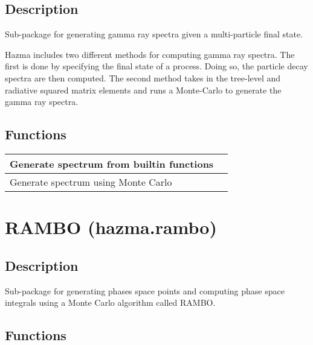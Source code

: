 \documentclass[letterpaper,10pt,english]{sphinxmanual}
\begin{document}
\section{Description}
\label{\detokenize{gamma_ray:description}}
Sub-package for generating gamma ray spectra given a multi-particle final state.

Hazma includes two different methods for computing gamma ray spectra. The first is done by specifying the final state of a process. Doing so, the particle decay spectra are then computed. The second method  takes in the tree-level and radiative squared matrix elements and runs a Monte-Carlo to generate the gamma ray spectra.


\section{Functions}
\label{\detokenize{gamma_ray:functions}}

\begin{savenotes}\sphinxattablestart
\centering
\begin{tabulary}{\linewidth}[t]{|T|T|}
\hline

Generate spectrum from builtin functions
&
\\
\hline
Generate spectrum using Monte Carlo
&
\\
\hline
\end{tabulary}
\par
\sphinxattableend\end{savenotes}


\chapter{RAMBO (hazma.rambo)}
\label{\detokenize{rambo::doc}}\label{\detokenize{rambo:rambo-hazma-rambo}}

\section{Description}
\label{\detokenize{rambo:description}}
Sub-package for generating phases space points and computing phase space integrals using a Monte Carlo algorithm called RAMBO.


\section{Functions}
\label{\detokenize{rambo:functions}}
\end{document}
